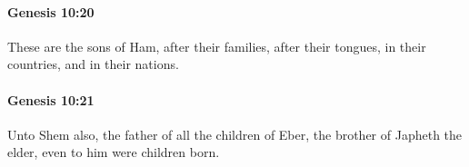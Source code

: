 		\paragraph{Genesis 10:20} %
			\label{GENESIS-10-20}

			These are the sons of Ham, after their families, after their tongues, in their countries, and in their nations.


		\paragraph{Genesis 10:21} %
			\label{GENESIS-10-21}

			Unto Shem also, the father of all the children of Eber, the brother of Japheth the elder, even to him were children born.


